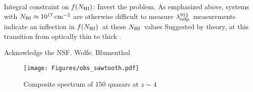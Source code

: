\documentclass[graybox]{svmult}
\newcommand{\mnhi}{N_{\rm HI}}
\newcommand{\nhi}{$\mnhi$}
\def\cm#1{\, {\rm cm^{#1}}}
\def\mfnhi{f(\mnhi)}
\def\fnhi{$\mfnhi$}
\def\mlmfp{\lambda_{\rm mfp}^{912}}
\def\lmfp{$\mlmfp$}
\begin{document}
Integral constraint on \fnhi: Invert the problem.
As emphasized above, systems with $\mnhi \approx 10^{17} \cm{-2}$
are otherwise difficult to measure
\lmfp\ measurements indicate an inflection in \fnhi\ at these
\nhi\ values
Suggested by theory, at this transition from optically thin to thick
\cite{zheng02,altay11}.

%
\begin{acknowledgement}
Acknowledge the NSF.  Wolfe.  Blumenthal
\end{acknowledgement}
%
%
%


%
\begin{figure}[b]
\sidecaption
\texttt{[image: Figures/obs\_sawtooth.pdf]}
%
%
\caption{Composite spectrum of 150 quasars at $z \sim 4$
}
\label{fig:stack_saw}       %
\end{figure}


%


\end{document}
